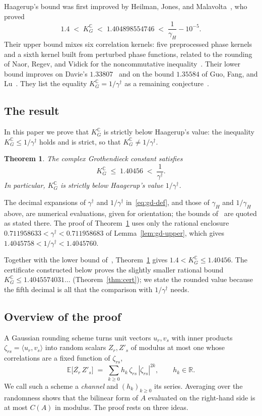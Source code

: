 \documentclass[11pt,reqno]{amsart}
\newtheorem{theorem}{Theorem}[section]
\theoremstyle{definition}
\numberwithin{equation}{section}
\newcommand{\C}{\mathbb{C}}
\newcommand{\R}{\mathbb{R}}
\newcommand{\E}{\mathbb{E}}
\newcommand{\KGC}{K_G^{\C}}
\newcommand{\gd}{\gamma^\dagger}
\begin{document}
Haagerup's bound was first improved by Heilman, Jones, and Malavolta~\cite{HJM26}, who proved
\[
  1.4 \;<\; \KGC \;<\; 1.404898554746 \;<\; \frac{1}{\gamma_H} - 10^{-5}.
\]
Their upper bound mixes six correlation kernels: five preprocessed phase kernels and a sixth kernel built from perturbed phase functions, related to the rounding of Naor, Regev, and Vidick for the noncommutative inequality~\cite{NRV14}. Their lower bound improves on Davie's $1.33807$~\cite{Dav84} and on the bound $1.35584$ of Guo, Fang, and Lu~\cite{GFL26}. They list the equality $\KGC = 1/\gd$ as a remaining conjecture~\cite[Section~1.1]{HJM26}.

\subsection{The result}
In this paper we prove that $\KGC$ is strictly below Haagerup's value: the inequality $\KGC\le1/\gd$ holds and is strict, so that $\KGC\ne1/\gd$.

\begin{theorem}\label{thm:main}
The complex Grothendieck constant satisfies
\[
  \KGC \;\le\; 1.40456
  \;<\; \frac{1}{\gd} .
\]
In particular, $\KGC$ is strictly below Haagerup's value $1/\gd$.
\end{theorem}

The decimal expansions of $\gd$ and $1/\gd$ in~\eqref{eq:gd-def}, and those of $\gamma_H$ and $1/\gamma_H$ above, are numerical evaluations, given for orientation; the bounds of~\cite{HJM26} are quoted as stated there. The proof of Theorem~\ref{thm:main} uses only the rational enclosure $0.711958633<\gd<0.711958683$ of Lemma~\ref{lem:gd-upper}, which gives $1.4045758<1/\gd<1.4045760$.

Together with the lower bound of~\cite{HJM26}, Theorem~\ref{thm:main} gives $1.4 < \KGC \le 1.40456$. The certificate constructed below proves the slightly smaller rational bound $\KGC\le 1.4045574031\ldots$ (Theorem~\ref{thm:cert}); we state the rounded value because the fifth decimal is all that the comparison with $1/\gd$ needs.

\subsection{Overview of the proof}\label{sec:overview}
A Gaussian rounding scheme turns unit vectors $u_r,v_s$ with inner products $\zeta_{rs}=\langle u_r,v_s\rangle$ into random scalars $Z_r,Z'_s$ of modulus at most one whose correlations are a fixed function of $\zeta_{rs}$,
\[
  \E\bigl[\overline{Z_r}\,Z'_s\bigr] \;=\; \sum_{k\ge0} h_k\,\zeta_{rs}\,|\zeta_{rs}|^{2k},\qquad h_k\in\R .
\]
We call such a scheme a \emph{channel} and $(h_k)_{k\ge0}$ its series. Averaging over the randomness shows that the bilinear form of $A$ evaluated on the right-hand side is at most $C(A)$ in modulus. The proof rests on three ideas.
\end{document}
